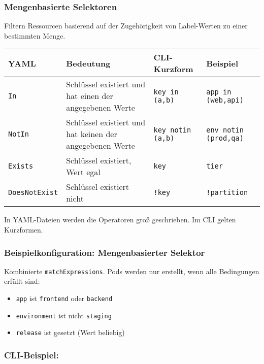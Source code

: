 \newpage
\subsubsection{Mengenbasierte Selektoren}

Filtern Ressourcen basierend auf der Zugehörigkeit von Label-Werten zu einer bestimmten Menge.

\begin{table}[h]
\renewcommand{\arraystretch}{1.2}
\centering
\begin{tabularx}{\textwidth}{|l|p{}|p{}|X|}
\hline
\textbf{YAML} & \textbf{Bedeutung} & \textbf{CLI-Kurzform} & \textbf{Beispiel} \\
\hline
\texttt{In} & Schlüssel existiert und hat einen der angegebenen Werte & \texttt{key in (a,b)} & \texttt{app in (web,api)} \\
\texttt{NotIn} & Schlüssel existiert und hat keinen der angegebenen Werte & \texttt{key notin (a,b)} & \texttt{env notin (prod,qa)} \\
\texttt{Exists} & Schlüssel existiert, Wert egal & \texttt{key} & \texttt{tier} \\
\texttt{DoesNotExist} & Schlüssel existiert nicht & \texttt{!key} & \texttt{!partition} \\
\hline
\end{tabularx}
\label{tab:setbasedselectors}
\end{table}
\noindent
In YAML-Dateien werden die Operatoren groß geschrieben. Im CLI gelten Kurzformen.
\subsubsection{Beispielkonfiguration: Mengenbasierter Selektor}

Kombinierte \texttt{matchExpressions}. Pods werden nur erstellt, wenn alle Bedingungen erfüllt sind:
\begin{itemize}
    \item \texttt{app} ist \texttt{frontend} oder \texttt{backend}
    \item \texttt{environment} ist nicht \texttt{staging}
    \item \texttt{release} ist gesetzt (Wert beliebig)
\end{itemize}
\subsubsection{CLI-Beispiel:}

\newpage
